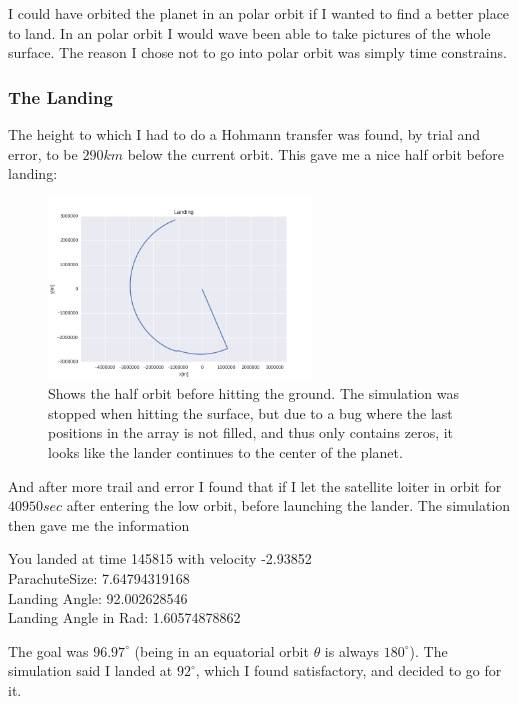 \documentclass[a4paper, 10pt]{article}
\begin{document}
I could have orbited the planet in an polar orbit if I wanted to find a better place to land. In an polar orbit I would wave been able to take pictures of the whole surface. The reason I chose not to go into polar orbit was simply time constrains.

\subsubsection{The Landing}

The height to which I had to do a Hohmann transfer was found, by trial and error, to be $290 km$ below the current orbit. This gave me a nice half orbit before landing:

\begin{figure}[H]
\centering
\includegraphics[width = 70mm]{part7landing.png}
\caption{Shows the half orbit before hitting the ground. The simulation was stopped when hitting the surface, but due to a bug where the last positions in the array is not filled, and thus only contains zeros, it looks like the lander continues to the center of the planet.}
\end{figure}

And after more trail and error I found that if I let the satellite loiter in orbit for $40950 sec$ after entering the low orbit, before launching the lander. The simulation then gave me the information

\begin{tcolorbox}
You landed at time 145815 with velocity -2.93852\\
ParachuteSize:  7.64794319168\\
Landing Angle:  92.002628546\\
Landing Angle in Rad:  1.60574878862
\end{tcolorbox}

The goal was $96.97^\circ$ (being in an equatorial orbit $\theta$ is always $180^\circ$). The simulation said I landed at $92^\circ$, which I found satisfactory, and decided to go for it.
\end{document}

